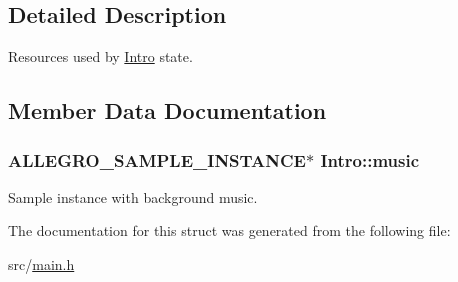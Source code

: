 \subsection{\-Detailed \-Description}
\-Resources used by \hyperlink{structIntro}{\-Intro} state. 

\subsection{\-Member \-Data \-Documentation}
\hypertarget{structIntro_a461ce3f44fd4f7d2d3713e2f31c1d1ec}{
\subsubsection[{music}]{\setlength{\rightskip}{0pt plus 5cm}\-A\-L\-L\-E\-G\-R\-O\-\_\-\-S\-A\-M\-P\-L\-E\-\_\-\-I\-N\-S\-T\-A\-N\-C\-E$\ast$ {\bf \-Intro\-::music}}}\label{structIntro_a461ce3f44fd4f7d2d3713e2f31c1d1ec}
\-Sample instance with background music. 

\-The documentation for this struct was generated from the following file\-:\begin{DoxyCompactItemize}
\item 
src/\hyperlink{main_8h}{main.\-h}\end{DoxyCompactItemize}
